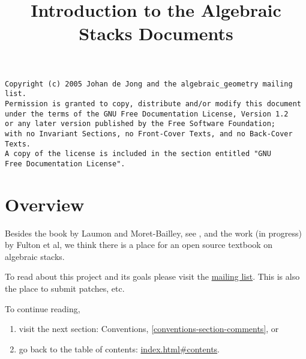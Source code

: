 \documentclass{amsart}
\theoremstyle{definition}
\theoremstyle{remark}
\numberwithin{equation}{subsection}
\begin{document}
\title{Introduction to the Algebraic Stacks Documents}


\maketitle
\thispagestyle{fancy}

\begin{verbatim}
Copyright (c) 2005 Johan de Jong and the algebraic_geometry mailing list.
Permission is granted to copy, distribute and/or modify this document
under the terms of the GNU Free Documentation License, Version 1.2
or any later version published by the Free Software Foundation;
with no Invariant Sections, no Front-Cover Texts, and no Back-Cover Texts.
A copy of the license is included in the section entitled "GNU
Free Documentation License".
\end{verbatim}

\tableofcontents

\section{Overview}
\label{section-overview}

\noindent
Besides the book by Laumon and Moret-Bailley, see \cite{LM-B}, and the work
(in progress) by Fulton et al, we think there is a place for an open source
textbook on algebraic stacks.

\smallskip\noindent
To read about this project and its goals please visit the
\href{http://www.math.columbia.edu/mailman/listinfo/algebraic_geometry}%
{mailing list}. This is also the place to submit patches, etc.

\smallskip\noindent
To continue reading, 
\begin{enumerate}

\item visit the next section: Conventions,
\autoref{conventions-section-comments}, or 

\item go back to the
table of contents: \url{index.html#contents}.

\end{enumerate}



\end{document}
